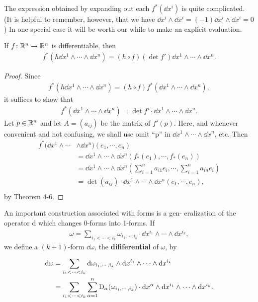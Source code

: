The expression obtained by expanding out each $f^*(\dd x^i)$ is quite
complicated. (It is helpful to remember, however, that we have 
$\dd x^i\wedge\dd x^i = (-1)\dd x^i\wedge\dd x^i = 0$)
In one special case it will be worth our while to make an explicit evaluation.

\begin{theorem}
    If $f\colon{}\mathbb{R}^n\to \mathbb{R}^n$ is differentiable, then 
    \begin{align*}
        f^*(h\dd x^1 \wedge \cdots \wedge \dd x^n) 
        = 
        (h\circ f)(\det f') \dd x^1\wedge \cdots \wedge \dd x^n.
    \end{align*}
\end{theorem}

\begin{proof}
    Since 
    \begin{align*}
        f^*(h\dd x^1\wedge\cdots\wedge\dd x^n) 
        = (h\circ f)f^*(\dd x^1\wedge\cdots\wedge \dd x^n),
    \end{align*}
    it suffices to show that 
    \begin{align*}
      f^*(\dd x^1\wedge\cdots\wedge\dd x^n) = \det f'\cdot \dd x^1\wedge\cdots\wedge\dd x^n.
    \end{align*}
    Let $p\in \mathbb{R}^n$ and let $A=(a_{ij})$ be the matrix of $f'(p)$. Here, and whenever 
    convenient and not confusing, we shall use omit ``p'' in $\dd x^1\wedge\cdots\wedge\dd x^n$, etc.
    Then 
    \begin{align*}
        f^*(\dd x^1\wedge\cdots & \wedge\dd x^n)(e_1, \cdots, e_n)\\
        & = \dd x^1\wedge \cdots \wedge \dd x^n (f_*(e_1), \cdots, f_*(e_n)) \\
        & = \dd x^1\wedge \cdots \wedge \dd x^n \left(\sum_{i=1}^{n}a_{i1}e_i, \cdots, \sum_{i=1}^{n}a_{in}e_i\right) \\
        & = \det(a_{ij})\cdot \dd x^1\wedge \cdots \wedge \dd x^n(e_1, \cdots, e_n), \\
    \end{align*}
    by Theorem 4-6.
\end{proof}

An important construction associated with forms is a gen-
eralization of the operator d which changes 0-forms into
1-forms. If 
\begin{align*}
  \omega = \sum_{i_1<\cdots<i_k}^{}{\omega_{i_1,\cdots,i_k}\cdot \dd x^{i_1}\wedge\cdots\wedge\dd x^{i_k}},
\end{align*}
we define a $(k+1)$-form $\dd\omega$, the \textbf{dififerential} of $\omega$, by 
\begin{align*}
  \mathrm{d}\omega 
  & = \sum_{i_1<\cdots<i_k}^{}{\mathrm{d}\omega_{i_1,\cdots,i_k}\wedge\mathrm{d} x^{i_1}\wedge\cdots\wedge\mathrm{d} x^{i_k}}\\
  & = \sum_{i_1<\cdots<i_k}^{}{\sum_{\alpha=1}^{n}{\mathrm{D}_\alpha(\omega_{i_1,\cdots,i_k})\cdot \mathrm{d} x^\alpha\wedge\mathrm{d} x^{i_1}\wedge\cdots\wedge\mathrm{d} x^{i_k}}}.
\end{align*}

